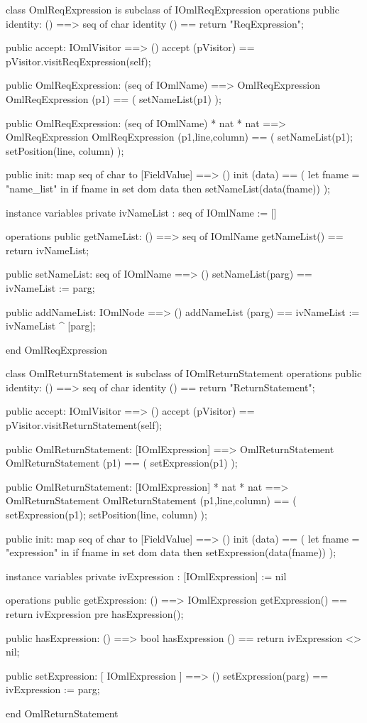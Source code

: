 \begin{vdm_al}
class OmlReqExpression is subclass of IOmlReqExpression
operations
  public identity: () ==> seq of char
  identity () == return "ReqExpression";

  public accept: IOmlVisitor ==> ()
  accept (pVisitor) == pVisitor.visitReqExpression(self);

  public OmlReqExpression:
    (seq of IOmlName) ==> OmlReqExpression
  OmlReqExpression (p1) == 
    ( setNameList(p1) );

  public OmlReqExpression:
    (seq of IOmlName) *
    nat *
    nat ==> OmlReqExpression
  OmlReqExpression (p1,line,column) == 
    ( setNameList(p1);
      setPosition(line, column) );

  public init: map seq of char to [FieldValue] ==> ()
  init (data) ==
    ( let fname = "name_list" in
        if fname in set dom data
        then setNameList(data(fname)) );

instance variables
  private ivNameList : seq of IOmlName := []

operations
  public getNameList: () ==> seq of IOmlName
  getNameList() == return ivNameList;

  public setNameList: seq of IOmlName ==> ()
  setNameList(parg) == ivNameList := parg;

  public addNameList: IOmlNode ==> ()
  addNameList (parg) == ivNameList := ivNameList ^ [parg];

end OmlReqExpression
\end{vdm_al}

\begin{vdm_al}
class OmlReturnStatement is subclass of IOmlReturnStatement
operations
  public identity: () ==> seq of char
  identity () == return "ReturnStatement";

  public accept: IOmlVisitor ==> ()
  accept (pVisitor) == pVisitor.visitReturnStatement(self);

  public OmlReturnStatement:
    [IOmlExpression] ==> OmlReturnStatement
  OmlReturnStatement (p1) == 
    ( setExpression(p1) );

  public OmlReturnStatement:
    [IOmlExpression] *
    nat *
    nat ==> OmlReturnStatement
  OmlReturnStatement (p1,line,column) == 
    ( setExpression(p1);
      setPosition(line, column) );

  public init: map seq of char to [FieldValue] ==> ()
  init (data) ==
    ( let fname = "expression" in
        if fname in set dom data
        then setExpression(data(fname)) );

instance variables
  private ivExpression : [IOmlExpression] := nil

operations
  public getExpression: () ==> IOmlExpression
  getExpression() == return ivExpression
    pre hasExpression();

  public hasExpression: () ==> bool
  hasExpression () == return ivExpression <> nil;

  public setExpression: [ IOmlExpression ] ==> ()
  setExpression(parg) == ivExpression := parg;

end OmlReturnStatement
\end{vdm_al}

